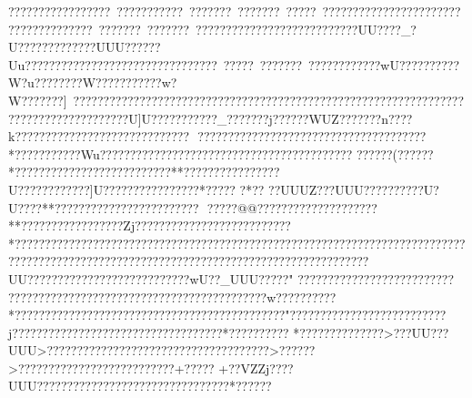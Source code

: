 {{{{{{{{{{{{{{{{{{{{{{{{{{{{{{{{{{{{{{{{{{{{{{{{{{{{{{{{{{{{{{{{{{{{{{{{{{{{{{{{{{{{{{{{{{{{{{{{{{{{{{{{{{{{{{{{{{{{{{{{{{{{{{{{{{{{{{{{{{{{{{{{{{{{{{{{{{{{{{{{{{{{{{{{{{{{{{{{{{{{{{{{{{{{{{{{{{{{{{{{{{{{{{{{{{{{{{{{{{{{{{{{{{{{{{{{{{{{{{{{{{{{{{{{{{{{{{{{{{{{{{{{{{{{{{{{{{{{{{{{{{{{{{{{{{{{{{{{{{{{{{{{{{{{{{{{{{{{{{{{{{{{{{{{{{{{{{{{{{{{{{{{{{{{{{{{{{{{{{{{{{{{{{{{{{{{{{{{{{{{{{{{{{{{{{{{{{{{{{{{{{{{{{{{{{{{{{{{{{{{{{{{{{{{{{{{{{{{{{{{{{{{{{{{{{{{{{{{{{{{{{{{{{{{{{{{{{{{{{{{{{{{{{{{{{{{{{{{{{{{{{{{{{{{{{{{{{{{{{{{{{{{{{{{{{{{{{{{{{{{{{{{{{{{{{{{{{{{{{{{{{{{{{{{{{{{{{{{{{{{{{{{{{{{{{{{{{{{{{{{{{{{{{{{{{{{{{{{{{{{{{{{{{{{{{{{{{{{{{{{{{{{{{{{{{{{{{{{{{{{{{{{{{{{{{{{{{{{{{{{{{{{{{{{{{{{{{{{{{{{{{{{{{{{{{{{{{{{{{{{{{{{{{{{{{{{{{{{{{{{{{{{{{{{{{{{{{{{{{{{{{{{{{{{{{{{{{{{{{{{{{{{{{{{{{{{{{{{{{{{{{{{{{{{{{{{{{{{{{{{{{{{{{{{{{{{{{{{{{{{{{{{{{{{{{{{{{{{{{{{{{{{{{{{{{{{{{{{{{{{{{{{{{{{{{{{{{{{{{{{{{{{{{{{{{{{{{{{{{{{{{{{{{{{{{{{{{{{{{{{{{{{{{{{{{{{{{{{{{{{{{{{{{{{{{{{{{{{{{{{{{{{{{{{{{{{{{{{{{{{{{{{{{{{{{{{{{{{{{{{{{{{{{{{{{{{{{{{{{{{{{{{{{{{{{{{{{{{{{{{{{{{{{{{{{{{{{{{{{{{{{{{{{{{{{{{{{{{{{{{{{{{{{{{{{{{{{{{{{{{{{{{{{{{{{{{{{{{{{{{{{{{{{{{{{{{{{{{{{{{{{{{{{{{{{{{{{{{{{{{{{{{{{{{{{{{{{{{{{{{{{{{{{{{{{{{{{{{{{{{{{{{{{{{{{{{{{{{{{{{{{{{{{{{{{{{{{{{{{{{{{{{{{{{{{{{{{{{{{{{{{{{{{{{{{{{{{{{{{{{{{{{{{{{{{{{{{{{{{{{{{{{{{{{{{{{{{{{{{{{{{{{{{{{{{{{{{{{{{{{{{{{{{{{{{{{{{{{{{{{{{{{{{{{{{{{{{{{{{{{{{{{{{{{{{{{{{{{{{{{{{{{{{{{{{{{{{{{{{{{{{{{{{{{{{{{{{{{{{{{{{{{{{{{{{{{{{{{{{{{{{{{{{{{{{{{{{{{{{{{{{{{{{{{{{{{{{{{{{{{{{{{{{{{{{{{{{{{{{{{{{{{{{{{{{{{{{{{{{{{{{{{{{{{{{{{{{{{{{{{{{{{{{{{{{{{{{{{{{{{{{{{{{{{{{{{{{{{{{{{{{{{{{{{{{{{{{{{{{{{{{{{{{{{{{{{{{{{{{{{{{{{{{{{{{{{{{{{{{{{{{{{{{{{{{{{{{{{{{{{{{{{{{{{{{{{{{{{{{{{{{{{{{{{{{{{{{{{{{{{{{{{{{{{{{{{{{{{{{{{{{{{{?????  ????????????~???????????~???????~???????~?????~?????????????????????????????????????~???????~???????~???????????????????????????UU????}_?U?????????????UUU??????Uu??????????????????????}??????????~?????~???????~????????????wU??????????W?u????????W???????????w?W???????]~?????????????????????????????????????????????????????????????????????????????????????U]U???????????_???????}j??????WUZ???????n????k?????????????????????????????

??????????????????????????????????????*???????????Wu???????????  ???????????????????????????????
??????(??????*?????????????????????????? **??????????  ??????}U????????????]U????????????????*?????  ?*??   
??UUUZ???UUU??????????U?U???? **????????????????????????

?????@@  ????????????????????**?????????????    ????Zj??????????????????????????*??????????????????????????????????????????????????????????????????????????????????????????????????????? ????????????????????????????????UU??    ??   ???? ???????????????????wU??_UUU??    ???  " ??????????????????????????  
???  ???? ???? ????????????????????????????????w??????????*????????????????????????????? ????????????????"??????????????????????????j???????????????????? ???????????????*??????????
*??????????????>??}?UU???UUU>?????????????????????????????????????>??????>??????????????????????????+????? 
+??VZZj????UUU?????   ????? ??????? ??????? ????????*?????? }}}}}}}}}}}}}}}}}}}}}}}}}}}}}}}}}}}}}}}}}}}}}}}}}}}}}}}}}}}}}}}}}}}}}}}}}}}}}}}}}}}}}}}}}}}}}}}}}}}}}}}}}}}}}}}}}}}}}}}}}}}}}}}}}}}}}}}}}}}}}}}}}}}}}}}}}}}}}}}}}}}}}}}}}}}}}}}}}}}}}}}}}}}}}}}}}}}}}}}}}}}}}}}}}}}}}}}}}}}}}}}}}}}}}}}}}}}}}}}}}}}}}}}}}}}}}}}}}}}}}}}}}}}}}}}}}}}}}}}}}}}}}}}}}}}}}}}}}}}}}}}}}}}}}}}}}}}}}}}}}}}}}}}}}}}}}}}}}}}}}}}}}}}}}}}}}}}}}}}}}}}}}}}}}}}}}}}}}}}}}}}}}}}}}}}}}}}}}}}}}}}}}}}}}}}}}}}}}}}}}}}}}}}}}}}}}}}}}}}}}}}}}}}}}}}}}}}}}}}}}}}}}}}}}}}}}}}}}}}}}}}}}}}}}}}}}}}}}}}}}}}}}}}}}}}}}}}}}}}}}}}}}}}}}}}}}}}}}}}}}}}}}}}}}}}}}}}}}}}}}}}}}}}}}}}}}}}}}}}}}}}}}}}}}}}}}}}}}}}}}}}}}}}}}}}}}}}}}}}}}}}}}}}}}}}}}}}}}}}}}}}}}}}}}}}}}}}}}}}}}}}}}}}}}}}}}}}}}}}}}}}}}}}}}}}}}}}}}}}}}}}}}}}}}}}}}}}}}}}}}}}}}}}}}}}}}}}}}}}}}}}}}}}}}}}}}}}}}}}}}}}}}}}}}}}}}}}}}}}}}}}}}}}}}}}}}}}}}}}}}}}}}}}}}}}}}}}}}}}}}}}}}}}}}}}}}}}}}}}}}}}}}}}}}}}}}}}}}}}}}}}}}}}}}}}}}}}}}}}}}}}}}}}}}}}}}}}}}}}}}}}}}}}}}}}}}}}}}}}}}}}}}}}}}}}}}}}}}}}}}}}}}}}}}}}}}}}}}}}}}}}}}}}}}}}}}}}}}}}}}}}}}}}}}}}}}}}}}}}}}}}}}}}}}}}}}}}}}}}}}}}}}}}}}}}}}}}}}}}}}}}}}}}}}}}}}}}}}}}}}}}}}}}}}}}}}}}}}}}}}}}}}}}}}}}}}}}}}}}}}}}}}}}}}}}}}}}}}}}}}}}}}}}}}}}}}}}}}}}}}}}}}}}}}}}}}}}}}}}}}}}}}}}}}}}}}}}}}}}}}}}}}}}}}}}}}}}}}}}}}}}}}}}}}}}}}}}}}}}}}}}}}}}}}}}}}}}}}}}}}}}}}}}}}}}}}}}}}}}}}}}}}}}}}}}}}}}}}}}}}}}}}}}}}}}}}}}}}}}}}}}}}}}}}}}}}}}}}}}}}}}}}}}}}}}}}}}}}}}}}}}}}}}}}}}}}}}}}}}}}}}}}}}}}}}}}}}}}}}}}}}}}}}}}}}}}}}}}}}}}}}}}}}}}}}}}}}}}}}}}}}}}}}}}}}}}}}}}}}}}}}}}}}}}}}}}}}}}}}}}}}}}}}}}}}}}}}}}}}}}}}}}}}}}}}}}}}}}}}}}}}}}}}}}}}}}}}}}}}}}}}}}}}}}}}}}}}}}}}}}}}}}}}}}}}}}}}}}}}}}}}}}}}}}}}}}}}}}}}}}}}}}}}}}}}}}}}}}}}}}}}}}}}}}}}}}}}}}}}}}}}}}}}}}}}}}}}}}}}}}}}}}}}}}}}}}}}}}}}}}}}}}}}}}}}}}}}}}}}}}}}}}}}}}}}}}}}}}}}}}}}}}}}}}}}}}}}}}}}}}}}}}}}}}}}}}}}}}}}}}}}}}}}}}}}}}}}}}}}}
